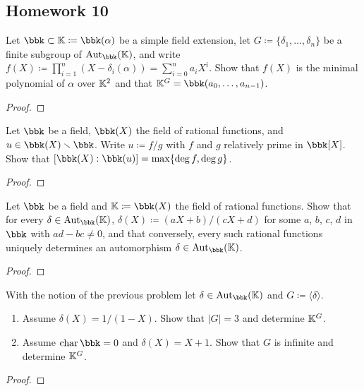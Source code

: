 \subsection{Homework 10}
\begin{problem}
  Let $\bbk\subset\bbK\coloneq\bbk(\alpha)$ be a simple field extension,
  let $G\coloneq\{\delta_1,\dotsc,\delta_n\}$ be a finite subgroup of
  $\Aut_\bbk(\bbK)$, and write
  $f(X)\coloneq\prod_{i=1}^n(X-\delta_i(\alpha))=\sum_{i=0}^na_iX^i$. Show
  that $f(X)$ is the minimal polynomial of $\alpha$ over $\mathbb{K}^2$ and that
  $\bbK^G=\bbk(a_0,\dotsc,a_{n-1})$.
\end{problem}
\begin{proof}
\end{proof}

\begin{problem}
  Let $\bbk$ be a field, $\bbk(X)$ the field of rational functions, and
  $u\in \bbk(X)\smallsetminus\bbk$. Write $u\coloneq f/g$ with $f$ and $g$
  relatively prime in $\bbk[X]$. Show that
  $[\bbk(X):\bbk(u)]=\max\{\deg f,\deg g\}$.
\end{problem}
\begin{proof}
\end{proof}

\begin{problem}
  Let $\bbk$ be a field and $\bbK\coloneq\bbk(X)$ the field of rational
  functions. Show that for every $\delta\in\Aut_\bbk(\bbK)$,
  $\delta(X)\coloneq (aX+b)/(cX+d)$ for some $a$, $b$, $c$, $d$ in $\bbk$
  with $ad-bc\neq 0$, and that conversely, every such rational functions
  uniquely determines an automorphism $\delta\in\Aut_\bbk(\bbK)$.
\end{problem}
\begin{proof}
\end{proof}

\begin{problem}
With the notion of the previous problem let $\delta\in\Aut_\bbk(\bbK)$ and
$G\coloneq\langle \delta \rangle$.
\begin{enumerate}[label=(\alph*),noitemsep]
\item Assume $\delta(X)=1/(1-X)$. Show that $|G|=3$ and determine $\mathbb{K}^G$.
\item Assume $\Char\bbk=0$ and $\delta(X)=X+1$. Show that $G$ is infinite and
  determine $\mathbb{K}^G$.
\end{enumerate}
\end{problem}
\begin{proof}
\end{proof}

